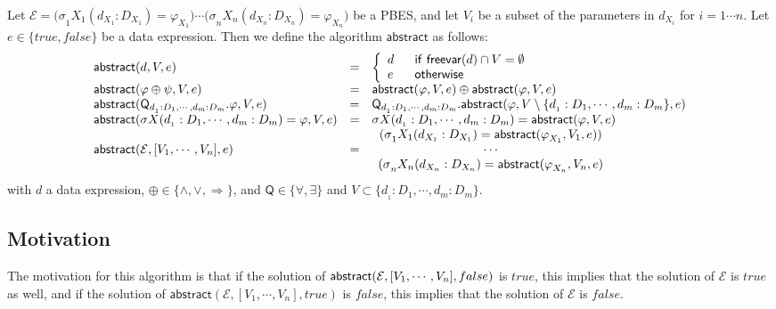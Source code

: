 \documentclass{article}
\begin{document}
Let $\mathcal{E=(\sigma }_{1}X_{1}(d_{X_{1}}:D_{X_{1}})=\varphi
_{X_{1}})\cdots \mathcal{(\sigma }_{n}X_{n}(d_{X_{n}}:D_{X_{n}})=\varphi
_{X_{n}})$ be a PBES, and let $V_{i}$ be a subset of the parameters in $%
d_{X_{i}}$ for $i=1\cdots n$. Let $e\in \{true,false\}$ be a data
expression. Then we define the algorithm $\mathsf{abstract}$ as follows:%
\begin{equation*}
\begin{array}{lll}
\mathsf{abstract}(d,V,e) & = & \left\{ 
\begin{array}{ll}
d & \text{\textsf{if}\ }\mathsf{freevar}(d)\cap V=\emptyset \\ 
e & \text{\textsf{otherwise}}%
\end{array}%
\right. \\ 
\mathsf{abstract}(\varphi \oplus \psi ,V,e) & = & \mathsf{abstract}(\varphi
,V,e)\oplus \mathsf{abstract}(\varphi ,V,e) \\ 
\mathsf{abstract}(\mathsf{Q}_{d_{_{1}}:D_{1},\cdots ,d_{m}:D_{m}}.\varphi
,V,e) & = & \mathsf{Q}_{d_{_{1}}:D_{1},\cdots ,d_{m}:D_{m}}.\mathsf{abstract}%
(\varphi ,V\setminus \{d_{_{1}}:D_{1},\cdots ,d_{m}:D_{m}\},e) \\ 
\mathsf{abstract}(\mathcal{\sigma }X(d_{_{1}}:D_{1},\cdots
,d_{m}:D_{m})=\varphi ,V,e) & = & \mathcal{\sigma }X(d_{_{1}}:D_{1},\cdots
,d_{m}:D_{m})=\mathsf{abstract}(\varphi ,V,e) \\ 
\mathsf{abstract}(\mathcal{E},[V_{1},\cdots ,V_{n}],e) & = & 
\begin{array}{c}
\mathcal{(\sigma }_{1}X_{1}(d_{X_{1}}:D_{X_{1}})=\mathsf{abstract(}\varphi
_{X_{1}},V_{1},e)) \\ 
\cdots \\ 
\mathcal{(\sigma }_{n}X_{n}(d_{X_{n}}:D_{X_{n}})=\mathsf{abstract(}\varphi
_{X_{n}},V_{n},e)%
\end{array}%
\end{array}%
\end{equation*}%
with $d$ a data expression, $\oplus \in \{\wedge ,\vee ,\Rightarrow \}$, and 
$\mathsf{Q\in \{\forall ,\exists \}}$ and $V\subset \{d_{_{1}}:D_{1},\cdots
,d_{m}:D_{m}\}$.

\subsection{Motivation}

The motivation for this algorithm is that if the solution of $\mathsf{%
abstract}(\mathcal{E},[V_{1},\cdots ,V_{n}],false)$ is $true$, this implies
that the solution of $\mathcal{E}$ is $true$ as well, and if the solution of 
$\mathsf{abstract}(\mathcal{E},[V_{1},\cdots ,V_{n}],true)$ is $false$, this
implies that the solution of $\mathcal{E}$ is $false$.\newpage
\end{document}

